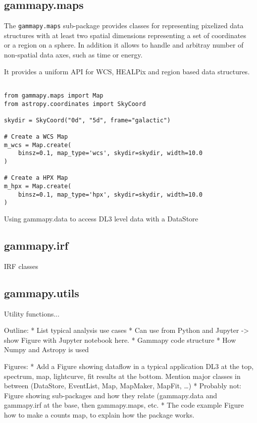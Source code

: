 \subsection{gammapy.maps}
The \verb|gammapy.maps| sub-package provides classes for representing pixelized
data structures with at least two spatial dimensions representing a set of
coordinates or a region on a sphere. In addition it allows to handle and arbitray
number of non-spatial data axes, such as time or energy.

It provides a uniform API for WCS, HEALPix and region based data structures.

\begin{listing}
\begin{verbatim}

from gammapy.maps import Map
from astropy.coordinates import SkyCoord

skydir = SkyCoord("0d", "5d", frame="galactic")

# Create a WCS Map
m_wcs = Map.create(
	binsz=0.1, map_type='wcs', skydir=skydir, width=10.0
)

# Create a HPX Map
m_hpx = Map.create(
	binsz=0.1, map_type='hpx', skydir=skydir, width=10.0
)

\end{verbatim}
\caption{Using gammapy.data to access DL3 level data with a DataStore}
\label{codeexample:data}
\end{listing}


\subsection{gammapy.irf}
IRF classes


\subsection{gammapy.utils}
Utility functions...


Outline:
* List typical analysis use cases
* Can use from Python and Jupyter -> show Figure with Jupyter notebook here.
* Gammapy code structure
* How Numpy and Astropy is used


Figures:
* Add a Figure showing dataflow in a typical application
DL3 at the top, spectrum, map, lightcurve, fit results at the bottom.
Mention major classes in between (DataStore, EventList, Map, MapMaker, MapFit, …)
* Probably not: Figure showing sub-packages and how they relate (gammapy.data and gammapy.irf at the base, then gammapy.maps, etc.
* The code example Figure how to make a counts map, to explain how the package works.

